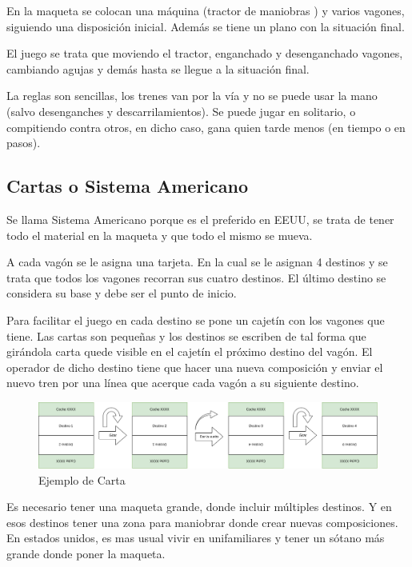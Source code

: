 En la maqueta se colocan una máquina (tractor de maniobras ) y varios vagones, siguiendo una disposición inicial. Además se tiene un plano con la situación final.

El juego se trata que moviendo el tractor, enganchado y desenganchado vagones, cambiando agujas y demás hasta se llegue a la situación final.

La reglas son sencillas, los trenes van por la vía y no se puede usar la mano (salvo desenganches y descarrilamientos). Se puede jugar en solitario, o compitiendo contra otros, en dicho caso, gana quien tarde menos (en tiempo o en pasos).

\subsection{Cartas o Sistema Americano}
Se llama Sistema Americano porque es el preferido en EEUU, se trata de tener todo el material en la maqueta y que todo el mismo se mueva.

A cada vagón se le asigna una tarjeta. En la cual se le asignan 4 destinos y se trata que todos los vagones recorran sus cuatro destinos. El último destino se considera su base y debe ser el punto de inicio.

Para facilitar el juego en cada destino se pone un cajetín con los vagones que tiene. Las cartas son pequeñas y los destinos se escriben de tal forma que girándola carta quede visible en el cajetín el próximo destino del vagón. El operador de dicho destino tiene que hacer una nueva composición y enviar el nuevo tren por una línea que acerque cada vagón a su siguiente destino.

\begin{figure}[h]
	\centering\includegraphics[width=\textwidth]{chapters/01_jugar/HowToPlay-cartas.png}
	\caption{Ejemplo de Carta}
	\label{fig:cartas} %
\end{figure}

Es necesario tener una maqueta grande, donde incluir múltiples destinos. Y en esos destinos tener una zona para maniobrar donde crear nuevas composiciones. En estados unidos, es mas usual vivir en unifamiliares y tener un sótano más grande donde poner la maqueta.

